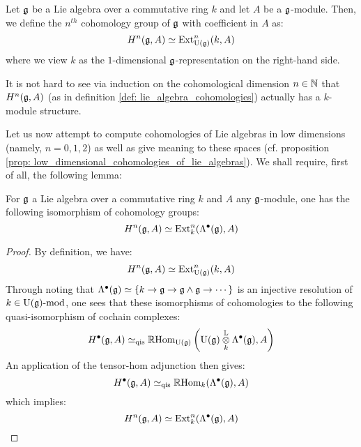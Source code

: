             \begin{definition} \label{def: lie_algebra_cohomologies}
                Let $\mathfrak{g}$ be a Lie algebra over a commutative ring $k$ and let $A$ be a $\mathfrak{g}$-module. Then, we define the $n^{th}$ cohomology group of $\mathfrak{g}$ with coefficient in $A$ as:
                    $$H^n(\mathfrak{g}, A) \simeq \mathrm{Ext}^n_{\mathrm{U}(\mathfrak{g})}(k, A)$$
                where we view $k$ as the $1$-dimensional $\mathfrak{g}$-representation on the right-hand side. 
            \end{definition}
            \begin{remark}
                It is not hard to see via induction on the cohomological dimension $n \in \mathbb{N}$ that $H^n(\mathfrak{g}, A)$ (as in definition \ref{def: lie_algebra_cohomologies}) actually has a $k$-module structure.
            \end{remark}
            
            Let us now attempt to compute cohomologies of Lie algebras in low dimensions (namely, $n = 0, 1, 2$) as well as give meaning to these spaces (cf. proposition \ref{prop: low_dimensional_cohomologies_of_lie_algebras}). We shall require, first of all, the following lemma:
            \begin{lemma} \label{lemma: de_rham_resolutions_of_lie_algebras}
                For $\mathfrak{g}$ a Lie algebra over a commutative ring $k$ and $A$ any $\mathfrak{g}$-module, one has the following isomorphism of cohomology groups:
                    $$H^n(\mathfrak{g}, A) \simeq \mathrm{Ext}^n_k(\Lambda^{\bullet}(\mathfrak{g}), A)$$
            \end{lemma}
                \begin{proof}
                    By definition, we have:
                        $$H^n(\mathfrak{g}, A) \simeq \mathrm{Ext}^n_{\mathrm{U}(\mathfrak{g})}(k, A)$$
                    Through noting that $\Lambda^{\bullet}(\mathfrak{g}) \simeq \{k \to \mathfrak{g} \to \mathfrak{g} \wedge \mathfrak{g} \to \cdots\}$ is an injective resolution of $k \in \mathrm{U}(\mathfrak{g})\text{-}\mathrm{mod}$, one sees that these isomorphisms of cohomologies  to the following quasi-isomorphism of cochain complexes:
                        $$H^{\bullet}(\g, A) \cong_{\qis} \R\Hom_{\U(\g)}\left(\U(\g) \tensor_k^{\L} \Lambda^{\bullet}(\g), A\right)$$
                    An application of the tensor-hom adjunction then gives:
                        $$H^{\bullet}(\mathfrak{g}, A) \simeq_{\mathrm{qis}} \mathbb{R}\mathrm{Hom}_k(\Lambda^{\bullet}(\mathfrak{g}), A)$$
                    which implies:
                        $$H^n(\mathfrak{g}, A) \simeq \mathrm{Ext}^n_k(\Lambda^{\bullet}(\mathfrak{g}), A)$$
                \end{proof}
            
